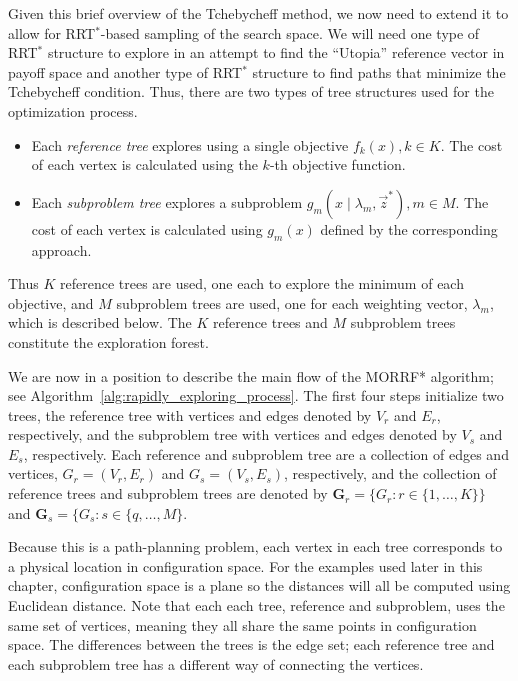 \documentclass{article}
\begin{document}

Given this brief overview of the Tchebycheff method, we now need to extend it to allow for RRT$^{*}$-based sampling of the search space.  
We will need one type of RRT$^{*}$ structure to explore in an attempt to find the ``Utopia'' reference vector in payoff space and another type of RRT$^{*}$ structure to find paths that minimize the Tchebycheff condition.  
Thus, there are two types of tree structures used for the optimization process.
\begin{itemize}
\item Each \emph{reference tree} explores using a single objective $ f_{k} (x), k \in K $. 
The cost of each vertex is calculated using the $ k $-th objective function.
\item Each \emph{subproblem tree} explores a subproblem $ g_{m} ( x \mid \lambda_{m} , \vec{z}^{*} ) , m \in M $.
The cost of each vertex is calculated using $ g_{m}(x) $ defined by the corresponding approach.
\end{itemize}
Thus $ K $ reference trees are used, one each to explore the minimum of each objective, and $ M $ subproblem trees are used, one for each weighting vector, $ \lambda_{m} $, which is described below.  
The $K$ reference trees and $M$ subproblem trees constitute the exploration forest.

We are now in a position to describe the main flow of the MORRF* algorithm; see Algorithm~\ref{alg:rapidly_exploring_process}.  
The first four steps initialize two trees, the reference tree with vertices and edges denoted by $V_r$ and $E_r$, respectively, and the subproblem tree with vertices and edges denoted by $V_s$ and $E_s$, respectively.  
Each reference and subproblem tree are a collection of edges and vertices, $G_r=(V_r,E_r)$ and $G_s=(V_s,E_s)$, respectively, and the collection of reference trees and subproblem trees are denoted by ${\mathbf G}_r = \{G_r: r\in \{1, \ldots, K\}\}$ and ${\mathbf G}_s = \{G_s: s \in \{q, \ldots, M\}$.  

Because this is a path-planning problem, each vertex in each tree corresponds to a physical location in configuration space.  
For the examples used later in this chapter, configuration space is a plane so the distances will all be computed using Euclidean distance. 
Note that each each tree, reference and subproblem, uses the same set of vertices, meaning they all share the same points in configuration space.  
The differences between the trees is the edge set; each reference tree and each subproblem tree has a different way of connecting the vertices.
\end{document}

